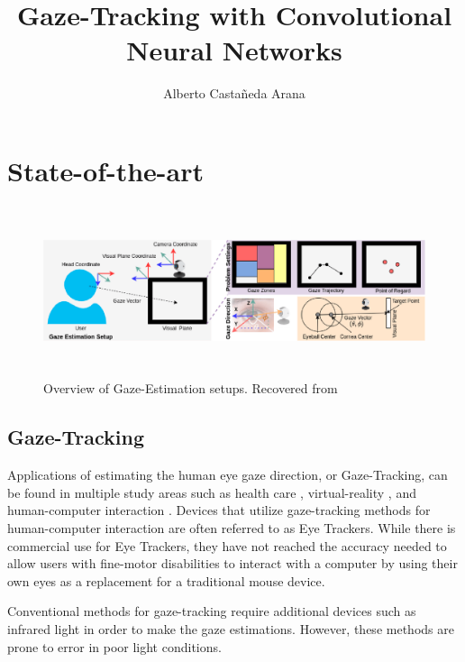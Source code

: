 \documentclass[letterpaper, 10 pt, conference]{ieeeconf}
\title{\LARGE \bf
Gaze-Tracking with Convolutional Neural Networks 
}
\author{Alberto Castañeda Arana %
}
\begin{document}
\maketitle
\tableofcontents

\thispagestyle{empty}
\pagestyle{empty}



\section{State-of-the-art}

\begin{figure}
    \centering
    \includegraphics[width=\textwidth,height=5cm]{figures/gaze_estimation_setup.png}
    \caption{Overview of Gaze-Estimation setups. Recovered from \cite{survey_automatic_gaze_ghosh}}
    \label{gaze_estimation_setup}
 \end{figure}

\subsection{Gaze-Tracking}

Applications of estimating the human eye gaze direction, or Gaze-Tracking, can be found in multiple study areas such as health care \cite{EyeTrackMedical}, virtual-reality \cite{EyeVR}, and human-computer interaction \cite{Gaze-Controlled-Web}. Devices that utilize gaze-tracking methods for human-computer interaction are often referred to as Eye Trackers. While there is commercial use for Eye Trackers, they have not reached the accuracy needed to allow users with fine-motor disabilities to interact with a computer by using their own eyes as a replacement for a traditional mouse device.

Conventional methods for gaze-tracking require additional devices such as infrared light in order to make the gaze estimations. However, these methods are prone to error in poor light conditions.
\end{document}
